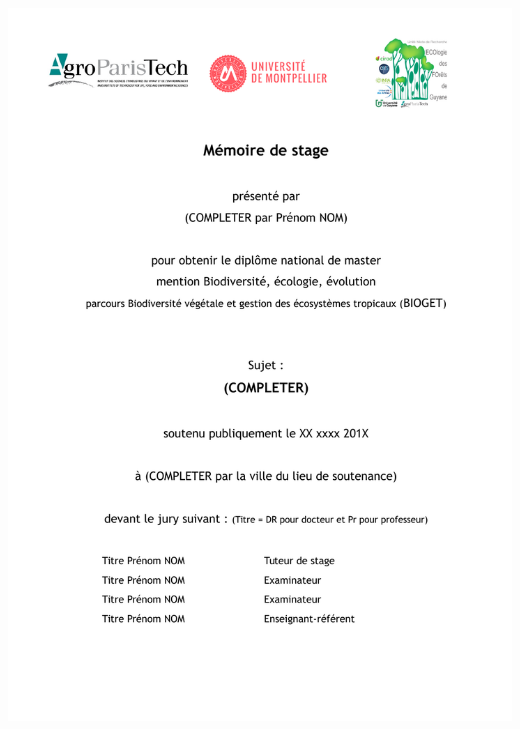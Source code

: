 \thispagestyle{empty}
\begin{center}
\includegraphics{images/main.pdf}
\end{center}

\setlength{\abovedisplayskip}{-5pt}
\setlength{\abovedisplayshortskip}{-5pt}

